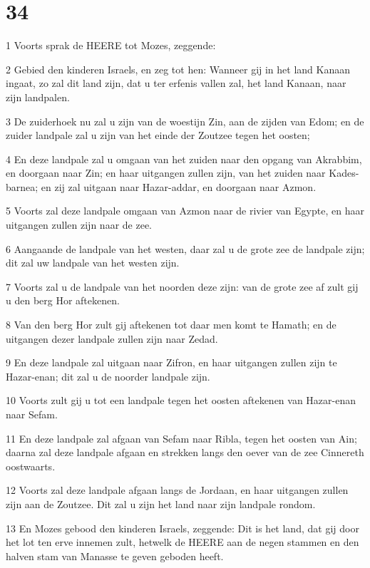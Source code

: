 \chapter{34}

\par 1 Voorts sprak de HEERE tot Mozes, zeggende:
\par 2 Gebied den kinderen Israels, en zeg tot hen: Wanneer gij in het land Kanaan ingaat, zo zal dit land zijn, dat u ter erfenis vallen zal, het land Kanaan, naar zijn landpalen.
\par 3 De zuiderhoek nu zal u zijn van de woestijn Zin, aan de zijden van Edom; en de zuider landpale zal u zijn van het einde der Zoutzee tegen het oosten;
\par 4 En deze landpale zal u omgaan van het zuiden naar den opgang van Akrabbim, en doorgaan naar Zin; en haar uitgangen zullen zijn, van het zuiden naar Kades-barnea; en zij zal uitgaan naar Hazar-addar, en doorgaan naar Azmon.
\par 5 Voorts zal deze landpale omgaan van Azmon naar de rivier van Egypte, en haar uitgangen zullen zijn naar de zee.
\par 6 Aangaande de landpale van het westen, daar zal u de grote zee de landpale zijn; dit zal uw landpale van het westen zijn.
\par 7 Voorts zal u de landpale van het noorden deze zijn: van de grote zee af zult gij u den berg Hor aftekenen.
\par 8 Van den berg Hor zult gij aftekenen tot daar men komt te Hamath; en de uitgangen dezer landpale zullen zijn naar Zedad.
\par 9 En deze landpale zal uitgaan naar Zifron, en haar uitgangen zullen zijn te Hazar-enan; dit zal u de noorder landpale zijn.
\par 10 Voorts zult gij u tot een landpale tegen het oosten aftekenen van Hazar-enan naar Sefam.
\par 11 En deze landpale zal afgaan van Sefam naar Ribla, tegen het oosten van Ain; daarna zal deze landpale afgaan en strekken langs den oever van de zee Cinnereth oostwaarts.
\par 12 Voorts zal deze landpale afgaan langs de Jordaan, en haar uitgangen zullen zijn aan de Zoutzee. Dit zal u zijn het land naar zijn landpale rondom.
\par 13 En Mozes gebood den kinderen Israels, zeggende: Dit is het land, dat gij door het lot ten erve innemen zult, hetwelk de HEERE aan de negen stammen en den halven stam van Manasse te geven geboden heeft.
